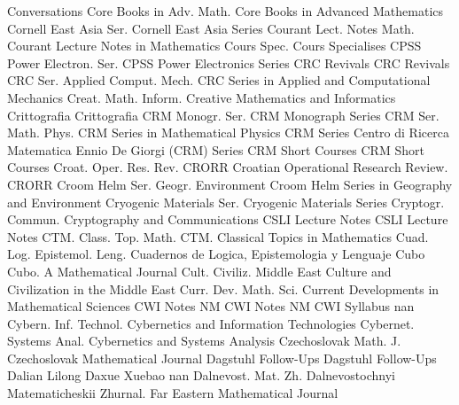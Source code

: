 {Conversations}
{Core Books in Adv. Math.}
{Core Books in Advanced Mathematics}
{Cornell East Asia Ser.}
{Cornell East Asia Series}
{Courant Lect. Notes Math.}
{Courant Lecture Notes in Mathematics}
{Cours Spec.}
{Cours Specialises}
{CPSS Power Electron. Ser.}
{CPSS Power Electronics Series}
{CRC Revivals}
{CRC Revivals}
{CRC Ser. Applied Comput. Mech.}
{CRC Series in Applied and Computational Mechanics}
{Creat. Math. Inform.}
{Creative Mathematics and Informatics}
{Crittografia}
{Crittografia}
{CRM Monogr. Ser.}
{CRM Monograph Series}
{CRM Ser. Math. Phys.}
{CRM Series in Mathematical Physics}
{CRM Series}
{Centro di Ricerca Matematica Ennio De Giorgi (CRM) Series}
{CRM Short Courses}
{CRM Short Courses}
{Croat. Oper. Res. Rev. CRORR}
{Croatian Operational Research Review. CRORR}
{Croom Helm Ser. Geogr. Environment}
{Croom Helm Series in Geography and Environment}
{Cryogenic Materials Ser.}
{Cryogenic Materials Series}
{Cryptogr. Commun.}
{Cryptography and Communications}
{CSLI Lecture Notes}
{CSLI Lecture Notes}
{CTM. Class. Top. Math.}
{CTM. Classical Topics in Mathematics}
{Cuad. Log. Epistemol. Leng.}
{Cuadernos de Logica, Epistemologia y Lenguaje}
{Cubo}
{Cubo. A Mathematical Journal}
{Cult. Civiliz. Middle East}
{Culture and Civilization in the Middle East}
{Curr. Dev. Math. Sci.}
{Current Developments in Mathematical Sciences}
{CWI Notes NM}
{CWI Notes NM}
{CWI Syllabus}
{nan}
{Cybern. Inf. Technol.}
{Cybernetics and Information Technologies}
{Cybernet. Systems Anal.}
{Cybernetics and Systems Analysis}
{Czechoslovak Math. J.}
{Czechoslovak Mathematical Journal}
{Dagstuhl Follow-Ups}
{Dagstuhl Follow-Ups}
{Dalian Lilong Daxue Xuebao}
{nan}
{Dalnevost. Mat. Zh.}
{Dalnevostochnyi Matematicheskii Zhurnal. Far Eastern Mathematical Journal}
